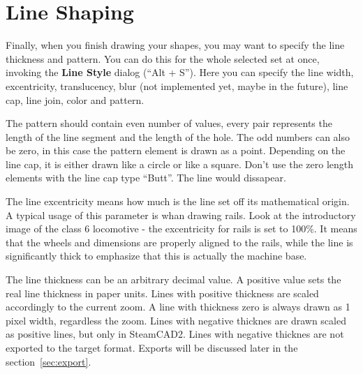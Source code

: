 \section{Line Shaping}

Finally, when you finish drawing your shapes, you may want to specify the line
thickness and pattern. You can do this for the whole selected set at once, invoking
the \textbf{Line Style} dialog (``Alt + S''). Here you can specify the line width,
excentricity, translucency, blur (not implemented yet, maybe in the future), line
cap, line join, color and pattern.

The pattern should contain even number of values, every pair represents the length
of the line segment and the length of the hole. The odd numbers can also be zero,
in this case the pattern element is drawn as a point. Depending on the line cap,
it is either drawn like a circle or like a square. Don't use the zero length elements
with the line cap type ``Butt''. The line would dissapear.

The line excentricity means how much is the line set off its mathematical origin.
A typical usage of this parameter is whan drawing rails. Look at the introductory
image of the class 6 locomotive - the excentricity for rails is set to 100\%.
It means that the wheels and dimensions are properly aligned to the rails, while
the line is significantly thick to emphasize that this is actually the machine
base.

The line thickness can be an arbitrary decimal value. A positive value sets the
real line thickness in paper units. Lines with positive thickness are scaled
accordingly to the current zoom. A line with thickness zero is always drawn
as 1 pixel width, regardless the zoom. Lines with negative thicknes are drawn
scaled as positive lines, but only in SteamCAD2. Lines with negative
thicknes are not exported to the target format. Exports will be discussed later
in the section~\ref{sec:export}.


